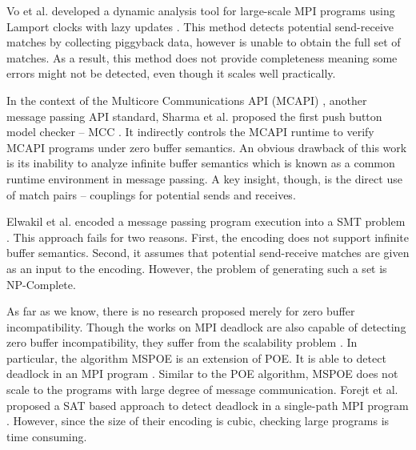 Vo et al. developed a dynamic analysis tool for large-scale MPI programs using Lamport clocks with lazy updates \cite{DBLP:conf/sc/VoAGSSB10,DBLP:conf/IEEEpact/VoGKSSB11}. This method detects potential send-receive matches by collecting piggyback data, however is unable to obtain the full set of matches. As a result, this method does not provide completeness meaning some errors might not be detected, even though it scales well practically.

In the context of the Multicore Communications API (MCAPI) \cite{mcapi}, another message passing API standard, Sharma et al. proposed the first push button model checker -- MCC \cite{DBLP:conf/fmcad/SharmaGMH09}. It indirectly controls the MCAPI runtime to verify MCAPI programs under zero buffer semantics. An obvious drawback of this work is its inability to analyze infinite buffer semantics which is known as a common runtime environment in message passing. A key insight, though, is the direct use of match pairs -- couplings for potential sends and receives.

Elwakil et al. encoded a message passing program execution into a SMT problem \cite{DBLP:conf/issta/ElwakilY10,DBLP:conf/atva/ElwakilYW10}. This approach fails for two reasons. First, the encoding does not support infinite buffer semantics. Second, it assumes that potential send-receive matches are given as an input to the encoding. However, the problem of generating such a set is NP-Complete.

As far as we know, there is no research proposed merely for zero buffer incompatibility. Though the works on MPI deadlock are also capable of detecting zero buffer incompatibility, they suffer from the scalability problem \cite{DBLP:conf/sbmf/SharmaGB12,DBLP:conf/fm/ForejtKNS14}. In particular, the algorithm MSPOE is an extension of POE. It is able to detect deadlock in an MPI program \cite{DBLP:conf/sbmf/SharmaGB12}. Similar to the POE algorithm, MSPOE does not scale to the programs with large degree of message communication. Forejt et al. proposed a SAT based approach to detect deadlock in a single-path MPI program \cite{DBLP:conf/fm/ForejtKNS14}. However, since the size of their encoding is cubic, checking large programs is time consuming. 

